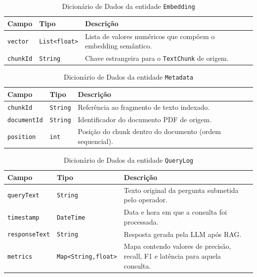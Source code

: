 \begin{table}[H]
  \centering
  \caption{Dicionário de Dados da entidade \texttt{Embedding}}
  \label{tab:dd_embedding}
  \begin{tabular}{|p{3cm}|p{4cm}|p{8cm}|}
    \hline
    \textbf{Campo}     & \textbf{Tipo}            & \textbf{Descrição} \\ \hline
    \texttt{vector}     & \texttt{List<float>}     & Lista de valores numéricos que compõem o embedding semântico. \\ \hline
    \texttt{chunkId}    & \texttt{String}          & Chave estrangeira para o \texttt{TextChunk} de origem. \\ \hline
  \end{tabular}
\end{table}

\begin{table}[H]
  \centering
  \caption{Dicionário de Dados da entidade \texttt{Metadata}}
  \label{tab:dd_metadata}
  \begin{tabular}{|p{3cm}|p{4cm}|p{8cm}|}
    \hline
    \textbf{Campo}       & \textbf{Tipo}   & \textbf{Descrição} \\ \hline
    \texttt{chunkId}      & \texttt{String} & Referência ao fragmento de texto indexado. \\ \hline
    \texttt{documentId}   & \texttt{String} & Identificador do documento PDF de origem. \\ \hline
    \texttt{position}     & \texttt{int}    & Posição do chunk dentro do documento (ordem sequencial). \\ \hline
  \end{tabular}
\end{table}

\begin{table}[H]
  \centering
  \caption{Dicionário de Dados da entidade \texttt{QueryLog}}
  \label{tab:dd_querylog}
  \begin{tabular}{|p{3cm}|p{4cm}|p{8cm}|}
    \hline
    \textbf{Campo}       & \textbf{Tipo}         & \textbf{Descrição} \\ \hline
    \texttt{queryText}    & \texttt{String}       & Texto original da pergunta submetida pelo operador. \\ \hline
    \texttt{timestamp}    & \texttt{DateTime}     & Data e hora em que a consulta foi processada. \\ \hline
    \texttt{responseText} & \texttt{String}       & Resposta gerada pela LLM após RAG. \\ \hline
    \texttt{metrics}      & \texttt{Map<String,float>} & Mapa contendo valores de precisão, recall, F1 e latência para aquela consulta. \\ \hline
  \end{tabular}
\end{table}

